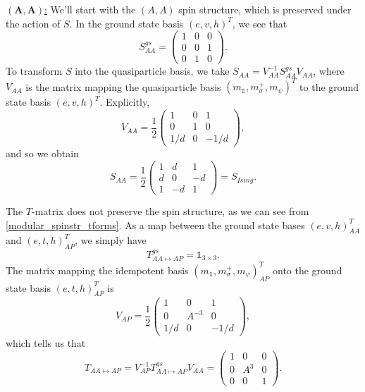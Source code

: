 \documentclass[12pt,a4paper]{article}
\newcommand{\unit}{\mathds{1}}
\newcommand\be            {\begin{equation}}
\newcommand\ee            {\end{equation}}
\begin{document}
\underline{$\mathbf{(A,A)}$:} We'll start with the $(A,A)$ spin structure, which is preserved under the action of $S$. 
In the ground state basis $(e,v,h)^T$, we see that
\be S^{gs}_{AA} = \begin{pmatrix} 1 & 0 &0 \\ 0 & 0 & 1 \\ 0 & 1 & 0\end{pmatrix}. \ee
To transform $S$ into the quasiparticle basis, we take $S_{AA}= V_{AA}^{-1}S^{gs}_{AA}V_{AA}$, where $V_{AA}$ is the matrix mapping the quasiparticle basis $(m_\unit,m_\sigma^+,m_\psi)^T$ to the ground state basis $(e,v,h)^T$. Explicitly, 
\be V_{AA}= \frac{1}{2}\begin{pmatrix}1&0&1 \\ 0 & 1 & 0\\ 1/d & 0 & -1/d \end{pmatrix},\ee
and so we obtain
\be S_{AA} = \frac{1}{2}\begin{pmatrix} 1 & d & 1 \\ d & 0 & -d \\ 1 & -d & 1 \end{pmatrix} = S_{Ising}.\ee

The $T$-matrix does not preserve the spin structure, as we can see from \eqref{modular_spinstr_tforms}. As a map between the ground state bases $(e,v,h)^T_{AA}$ and $(e,t,h)_{AP}^T$, we simply have
\be T_{AA\mapsto AP}^{gs} = \unit_{3\times 3}.\ee
The matrix mapping the idempotent basis $(m_\unit,m_\sigma^+,m_\psi)^T_{AP}$ onto the ground state basis $(e,t,h)_{AP}^T$  is
\be V_{AP} = \frac{1}{2} \begin{pmatrix} 1 & 0 & 1 \\ 0 & A^{-3} & 0 \\ 1/d & 0 & -1/d \end{pmatrix},\ee
which tells us that 
\be T_{AA\mapsto AP} = V_{AP}^{-1} T_{AA\mapsto AP}^{gs} V_{AA} =  \begin{pmatrix}
1 &0&0 \\ 0&A^3&0\\0&0&1
\end{pmatrix}.\ee
\end{document}
